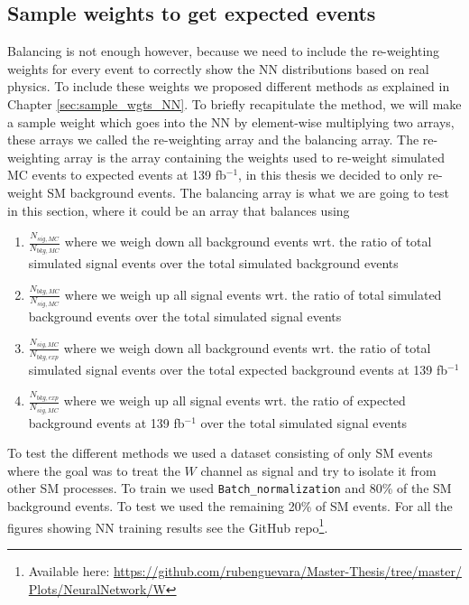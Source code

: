 \documentclass[12pt, a4paper]{book}
\begin{document}
\subsection{Sample weights to get expected events}\label{sec:samp_wgts_NN_res}
Balancing is not enough however, because we need to include the re-weighting weights for every event to correctly show the NN distributions based on real physics. To include these weights we proposed different methods as explained in Chapter \ref{sec:sample_wgts_NN}. 
To briefly recapitulate the method, we will make a sample weight which goes into the NN by element-wise multiplying two arrays, these arrays we called the re-weighting array and the balancing array. The re-weighting array is the array containing the weights used to re-weight 
simulated MC events to expected events at 139 fb$^{-1}$, in this thesis we decided to only re-weight SM background events. The balancing array is what we are going to test in this section, where it could be an array that balances using 
\begin{enumerate}
   \item $\frac{N_{sig,MC}}{N_{bkg,MC}}$ where we weigh down all background events wrt. the ratio of total simulated signal events over the total simulated background events
   \item $\frac{N_{bkg,MC}}{N_{sig,MC}}$ where we weigh up all signal events wrt. the ratio of total simulated background events over the total simulated signal events
   \item $\frac{N_{sig,MC}}{N_{bkg,exp}}$ where we weigh down all background events wrt. the ratio of total simulated signal events over the total expected background events at 139 fb$^{-1}$
   \item $\frac{N_{bkg,exp}}{N_{sig,MC}}$ where we weigh up all signal events wrt. the ratio of expected background events at 139 fb$^{-1}$ over the total simulated signal events
\end{enumerate}
To test the different methods we used a dataset consisting of only SM events where the goal was to treat the $W$ channel as signal and try to isolate it from other SM processes. To train we used \verb|Batch_normalization| and 80\% of the SM background events. 
To test we used the remaining 20\% of SM events. For all the figures showing NN training results see the GitHub repo\footnote{Available here: \href{https://github.com/rubenguevara/Master-Thesis/tree/master/Plots/NeuralNetwork/W}{https://github.com/rubenguevara/Master-Thesis/tree/master/\\Plots/NeuralNetwork/W}}. 
\end{document}
